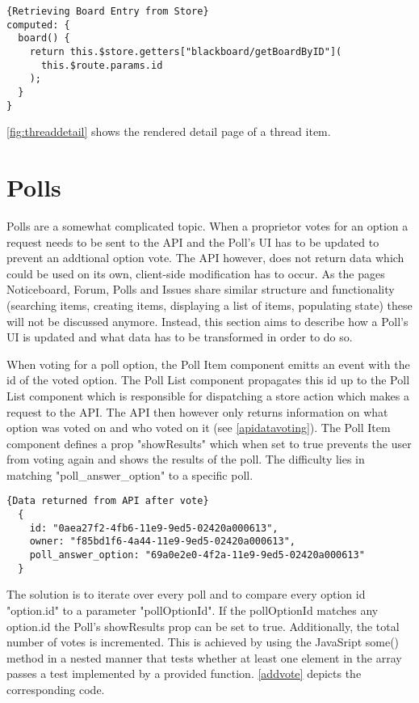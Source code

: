 \begin{lstlisting}[caption=Retrieving Board Entry from Store, captionpos=b, style=htmlcssjs, label=boardentrylookup]{Retrieving Board Entry from Store}
computed: {
  board() {
    return this.$store.getters["blackboard/getBoardByID"](
      this.$route.params.id
    );
  }
}
\end{lstlisting}

\autoref{fig:threaddetail} shows the rendered detail page of a thread item.

\section{Polls}
Polls are a somewhat complicated topic. When a proprietor votes for an option a request needs to be sent to the API and the Poll's UI has to be updated to prevent an addtional option vote. The API however, does not return data which could be used on its own, client-side modification has to occur. As the pages Noticeboard, Forum, Polls and Issues share similar structure and functionality (searching items, creating items, displaying a list of items, populating state) these will not be discussed anymore. Instead, this section aims to describe how a Poll's UI is updated and what data has to be transformed in order to do so.

When voting for a poll option, the Poll Item component emitts an event with the id of the voted option. The Poll List component propagates this id up to the Poll List component which is responsible for dispatching a store action which makes a request to the API. The API then however only returns information on what option was voted on and who voted on it (see \autoref{apidatavoting}). The Poll Item component defines a prop "showResults" which when set to true prevents the user from voting again and shows the results of the poll. The difficulty lies in matching "poll\_answer\_option" to a specific poll. \newline

\begin{lstlisting}[caption=Data returned from API after vote, captionpos=b, style=htmlcssjs, label=apidatavoting]{Data returned from API after vote}
  {
    id: "0aea27f2-4fb6-11e9-9ed5-02420a000613",
    owner: "f85bd1f6-4a44-11e9-9ed5-02420a000613",
    poll_answer_option: "69a0e2e0-4f2a-11e9-9ed5-02420a000613"
  }
\end{lstlisting}

The solution is to iterate over every poll and to compare every option id "option.id" to a parameter "pollOptionId". If the pollOptionId matches any option.id the Poll's showResults prop can be set to true. Additionally, the total number of votes is incremented. This is achieved by using the JavaSript some() method in a nested manner that tests whether at least one element in the array passes a test implemented by a provided function. \autoref{addvote} depicts the corresponding code.

